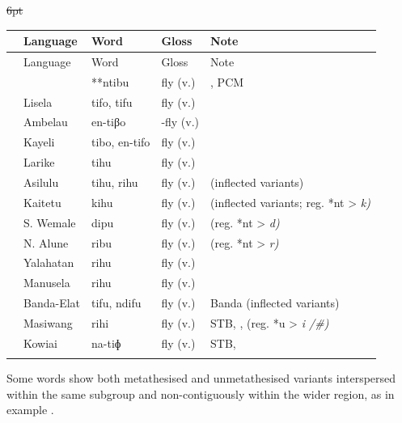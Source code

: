 {\wg\st{6pt}\begin{xltabular}[l]{\linewidth}{>{\hspace{-\tabcolsep}}l<{\hspace{-\tabcolsep}}>{\hspace{-\tabcolsep}\enspace}lll>{\raggedright\arraybackslash}X}
\lsptoprule
{}	&	Language					&	{\hr\hr}Word	&	Gloss	&	Note		\\	\midrule
\endfirsthead
\lsptoprule
{}	&	Language					&	{\hr\hr}Word	&	Gloss	&	Note		\\	\midrule
\endhead
	&					&	**ntibu	&	fly (v.) & \citet[55]{Collins1983}, PCM\\
	&	Lisela	&	{\hr\hr}tifo, tifu	&	fly (v.)	&		\\
	&	Ambelau	&	{\hr\hr}en-tiβo	&	-fly (v.)	&		\\
	&	Kayeli	&	{\hr\hr}tibo, en-tifo	&	fly (v.)	&		\\
	&	Larike	&	{\hr\hr}tihu	&	fly (v.)	&		\\
	&	Asilulu	&	{\hr\hr}tihu, rihu	&	fly (v.)	&	 (inflected variants)	\\
	&	Kaitetu	&	{\hr\hr}kihu	&	fly (v.)	&	 (inflected variants; reg. *nt > \it{k})	\\
	&	S. Wemale	&	{\hr\hr}dipu	&	fly (v.)	&	 (reg. *nt > \it{d)}	\\
	&	N. Alune	&	{\hr\hr}ribu	&	fly (v.)	&	 (reg. *nt > \it{r)}	\\
	&	Yalahatan	&	{\hr\hr}rihu	&	fly (v.)	&		\\
	&	Manusela	&	{\hr\hr}rihu	&	fly (v.)	&		\\
	&	Banda-Elat	&	{\hr\hr}tifu, ndifu	&	fly (v.)	&	Banda (inflected variants)	\\
	&	Masiwang	&	{\hr\hr}rihi	&	fly (v.)	&	STB, , (reg. *u > \it{i} /{\gap}{\#})	\\
	&	Kowiai	&	{\hr\hr}na-tiɸ	&	fly (v.)	&	STB, 	\\
\lspbottomrule
\end{xltabular}\addtocounter{table}{-1}}

Some words show both metathesised
and unmetathesised variants interspersed within the same subgroup
and non-contiguously within the wider region,
as in example .

